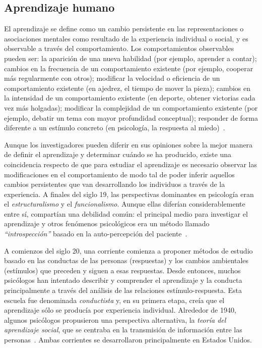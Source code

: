\documentclass[a4paper,11pt]{book}
\theoremstyle{definition}
\begin{document}

\subsection{Aprendizaje humano}

El aprendizaje se define como un cambio persistente en las representaciones o asociaciones mentales como resultado de la experiencia individual o social, y es observable a trav\'es del comportamiento.
%
Los comportamientos observables pueden ser: la aparici\'on de una nueva habilidad (por ejemplo, aprender a contar); cambios en la frecuencia de un comportamiento existente (por ejemplo, cooperar m\'as regularmente con otros); modificar la velocidad o eficiencia de un comportamiento existente (en ajedrez, el tiempo de mover la pieza); cambios en la intensidad de un comportamiento existente (en deporte, obtener victorias cada vez m\'as holgadas); modificar la complejidad de un comportamiento existente (por ejemplo, debatir un tema con mayor profundidad conceptual); responder de forma diferente a un est\'imulo concreto (en psicolog\'ia, la respuesta al miedo)~\cite{Ormrod2017}.


Aunque los investigadores pueden diferir en sus opiniones sobre la mejor manera de definir el aprendizaje y determinar cu\'ando se ha producido, existe una coincidencia respecto de que para estudiar el aprendizaje es necesario observar las modificaciones en el comportamiento de modo tal de poder inferir aquellos cambios persistentes que van desarrollando los individuos a trav\'es de la experiencia.
%
A finales del siglo 19, las perspectivas dominantes en psicolog\'ia eran el \emph{estructuralismo} y el \emph{funcionalismo}.
%
Aunque ellas difer\'ian considerablemente entre s\'i, compart\'ian una debilidad com\'un: el principal medio para investigar el aprendizaje y otros fen\'omenos psicol\'ogicos era un m\'etodo llamado \emph{``introspecci\'on''} basado en la auto-percepci\'on del paciente~\cite{Ormrod2017}.


A comienzos del siglo 20, una corriente comienza a proponer m\'etodos de estudio basado en las conductas de las personas (respuestas) y los cambios ambientales (est\'imulos) que preceden y siguen a esas respuestas.
%
Desde entonces, muchos psic\'ologos han intentado describir y comprender el aprendizaje y la conducta principalmente a trav\'es del an\'alisis de las relaciones est\'imulo-respuesta.
%
Esta escuela fue denominada \emph{conductista} y, en su primera etapa, cre\'ia que el aprendizaje s\'olo se produc\'ia por experiencia individual.
%
Alrededor de 1940, algunos psic\'ologos propusieron una perspectiva alternativa, la \emph{teor\'ia del aprendizaje social}, que se centraba en la transmisi\'on de informaci\'on entre las personas~\cite{Ormrod2017}.
%
Ambas corrientes se desarrollaron principalmente en Estados Unidos.
\end{document}
